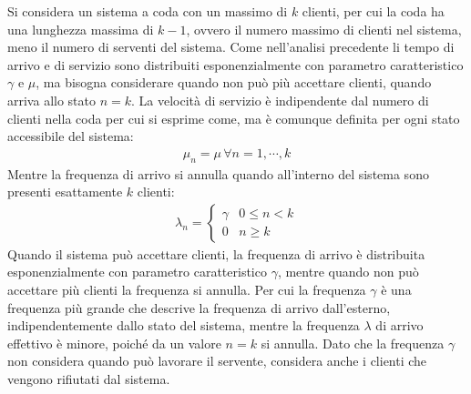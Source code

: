 \documentclass{article}
\numberwithin{equation}{subsection}
\begin{document}
Si considera un sistema a coda con un massimo di $k$ clienti, per cui la coda ha una lunghezza massima di $k-1$, ovvero il numero massimo di clienti nel sistema, meno il numero 
di serventi del sistema. Come nell'analisi precedente li tempo di arrivo e di servizio sono distribuiti esponenzialmente con parametro caratteristico $\gamma$ e $\mu$, ma 
bisogna considerare quando non può più accettare clienti, quando arriva allo stato $n=k$. La velocità di servizio è indipendente dal numero di clienti nella coda per cui si 
esprime come, ma è comunque definita per ogni stato accessibile del sistema: 
\begin{gather*}
    \mu_n=\mu\,\forall n=1,\cdots,k
\end{gather*}
Mentre la frequenza di arrivo si annulla quando all'interno del sistema sono presenti esattamente $k$ clienti:
\begin{gather*}
    \lambda_n=\begin{cases}
        \gamma&0\leq n<k\\
        0 &n\geq k
    \end{cases}
\end{gather*}
Quando il sistema può accettare clienti, la frequenza di arrivo è distribuita esponenzialmente con parametro caratteristico $\gamma$, mentre quando non può accettare più 
clienti la frequenza si annulla. Per cui la frequenza $\gamma$ è una frequenza più grande che descrive la frequenza di arrivo dall'esterno, indipendentemente dallo stato 
del sistema, mentre la frequenza $\lambda$ di arrivo effettivo è minore, poiché da un valore $n=k$ si annulla. Dato che la frequenza $\gamma$ non considera quando può lavorare 
il servente, considera anche i clienti che vengono rifiutati dal sistema. 
\end{document}
